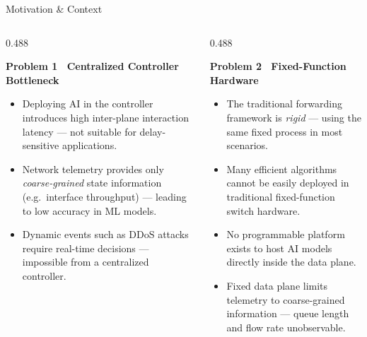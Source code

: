 {\begin{frame}{Motivation \& Context}
\begin{columns}[T, totalwidth=\textwidth]
  \end{columns}

  \vspace{0.15cm}

\begin{columns}[T, totalwidth=\textwidth]

  \begin{column}{0.488\textwidth}
    \begin{tcolorbox}[problemcard=problemorange]
      {\color{problemorange}\bfseries\small
        Problem 1 \textemdash\ Centralized Controller Bottleneck}
      \vspace{4pt}
      \begin{itemize}
        \setlength\itemsep{3pt}
        \footnotesize
        \item Deploying AI in the controller introduces
              high inter-plane interaction latency ---
              not suitable for delay-sensitive applications.
        \item Network telemetry provides only
              \textit{coarse-grained} state information
              (e.g.\ interface throughput) --- leading to
              low accuracy in ML models.
        \item Dynamic events such as DDoS attacks require
              real-time decisions --- impossible from a
              centralized controller. \newline
      \end{itemize}
    \end{tcolorbox}
  \end{column}

  \begin{column}{0.488\textwidth}
    \begin{tcolorbox}[problemcard=problemred]
      {\color{problemred}\bfseries\small
        Problem 2 \textemdash\ Fixed-Function Hardware}
      \vspace{4pt}
      \begin{itemize}
        \setlength\itemsep{3pt}
        \footnotesize
        \item The traditional forwarding framework is
              \textit{rigid} --- using the same fixed
              process in most scenarios.
        \item Many efficient algorithms cannot be easily
              deployed in traditional fixed-function
              switch hardware.
        \item No programmable platform exists to host
              AI models directly inside the data plane.
        \item Fixed data plane limits telemetry to
              coarse-grained information ---
              queue length and flow rate unobservable. 
      \end{itemize}
    \end{tcolorbox}
  \end{column}

\end{columns}

\end{frame}
}